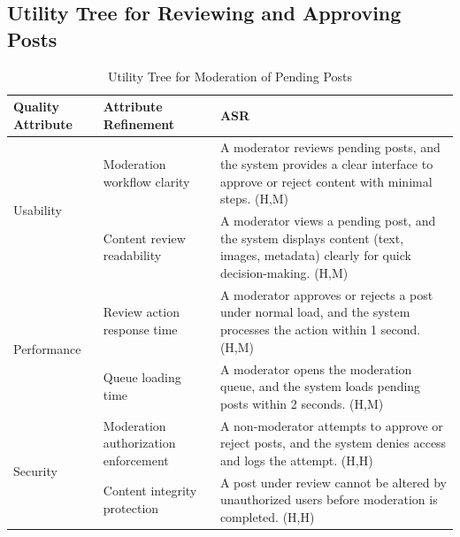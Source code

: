 \documentclass{article}
\begin{document}
\subsection{Utility Tree for Reviewing and Approving Posts}

\begin{table}[H]
    \centering
    \caption{Utility Tree for Moderation of Pending Posts}
    \begin{tabular}{|p{3cm}|p{4cm}|p{7cm}|}
        \hline
        \textbf{Quality Attribute} & \textbf{Attribute Refinement}                                                                                                                  & \textbf{ASR} \\
        \hline

        \multirow{2}{*}{Usability}
                                   & Moderation workflow clarity
                                   & A moderator reviews pending posts, and the system provides a clear interface to approve or reject content with minimal steps. (H,M)                           \\
        \cline{2-3}
                                   & Content review readability
                                   & A moderator views a pending post, and the system displays content (text, images, metadata) clearly for quick decision-making. (H,M)                           \\
        \hline

        \multirow{2}{*}{Performance}
                                   & Review action response time
                                   & A moderator approves or rejects a post under normal load, and the system processes the action within 1 second. (H,M)                                          \\
        \cline{2-3}
                                   & Queue loading time
                                   & A moderator opens the moderation queue, and the system loads pending posts within 2 seconds. (H,M)                                                            \\
        \hline

        \multirow{2}{*}{Security}
                                   & Moderation authorization enforcement
                                   & A non-moderator attempts to approve or reject posts, and the system denies access and logs the attempt. (H,H)                                                 \\
        \cline{2-3}
                                   & Content integrity protection
                                   & A post under review cannot be altered by unauthorized users before moderation is completed. (H,H)                                                             \\
        \hline


\end{tabular}
\end{table}
\end{document}
